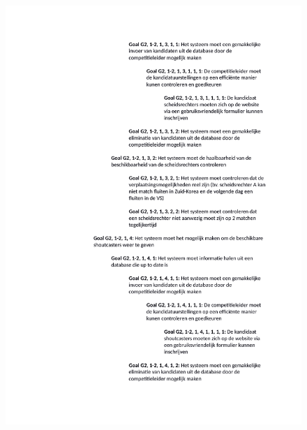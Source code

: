 \documentclass[12pt,a4paper]{article}
\begin{document}
			\begin{figure}[H]
				\includegraphics[width=\textwidth]{../2-Doelen/Goals3.pdf}
			\end{figure}
			
\end{document}
